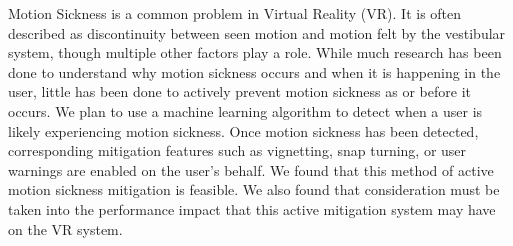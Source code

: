 Motion Sickness is a common problem in Virtual Reality (VR).
It is often described as discontinuity between seen motion and motion felt by the vestibular system, though multiple other factors play a role.
While much research has been done to understand why motion sickness occurs and when it is happening in the user, little has been done to actively prevent motion sickness as or before it occurs.
We plan to use a machine learning algorithm to detect when a user is likely experiencing motion sickness.
Once motion sickness has been detected, corresponding mitigation features such as vignetting, snap turning, or user warnings are enabled on the user's behalf.
We found that this method of active motion sickness mitigation is feasible.
We also found that consideration must be taken into the performance impact that this active mitigation system may have on the VR system.
